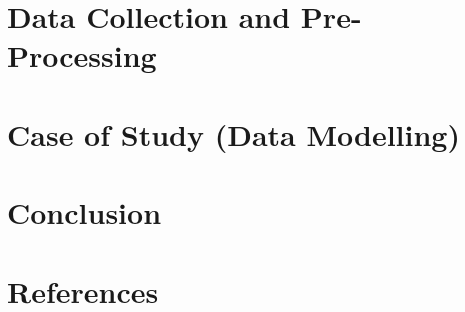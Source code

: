 \documentclass[fontsize=11pt,paper=a4,pagesize=auto]{report}
\begin{document}
\chapter{Data Collection and Pre-Processing}


\chapter{Case of Study (Data Modelling) }


\chapter{Conclusion}


\chapter{References}



       
\end{document}
